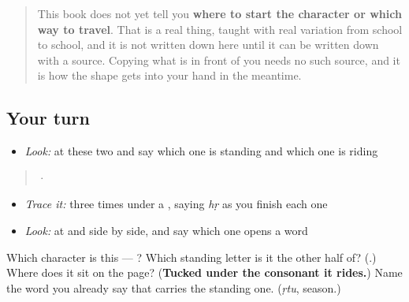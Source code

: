 \begin{quote}
This book does not yet tell you \textbf{where to start the character or which way to travel}. That is a real thing, taught with real variation from school to school, and it is not written down here until it can be written down with a source. Copying what is in front of you needs no such source, and it is how the shape gets into your hand in the meantime.
\end{quote}

\subsection*{Your turn}
\begin{itemize}
\raggedright
  \item \emph{Look:} at these two and say which one is standing and which one is riding
\end{itemize}

\begin{quote}
  ·  
\end{quote}

\begin{itemize}
\raggedright
  \item \emph{Trace it:}  three times under a , saying \emph{hṛ} as you finish each one
  \item \emph{Look:} at  and  side by side, and say which one opens a word
\end{itemize}

\begin{tcolorbox}[breakable,colback=teal!4,colframe=teal!35!black,title={Before you move on}]
Which character is this — ? Which standing letter is it the other half of? (\textbf{}.) Where does it sit on the page? (\textbf{Tucked under the consonant it rides.}) Name the word you already say that carries the standing one. (\emph{ṛtu}, season.)
\end{tcolorbox}
